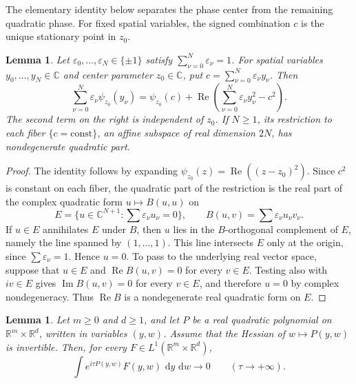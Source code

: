 \documentclass[a4paper,11pt]{article}
\newcommand{\R}{\mathbb{R}}
\newcommand{\C}{\mathbb{C}}
\newcommand{\dd}{\,\text{d}}
\theoremstyle{plain}
\newtheorem{lem}[thm]{Lemma}
\theoremstyle{definition}
\theoremstyle{remark}
\begin{document}
The elementary identity below separates the phase center from the remaining quadratic phase. For fixed spatial variables, the signed combination $c$ is the unique stationary point in $z_0$.

\begin{lem}\label{lem-signed-quadratic-normal-form}
Let $\varepsilon_0,\ldots,\varepsilon_N\in\{\pm1\}$ satisfy
$\sum_{\nu=0}^N\varepsilon_\nu=1$.  For spatial variables
$y_0,\ldots,y_N\in\C$ and center parameter $z_0\in\C$, put
$c=\sum_{\nu=0}^N\varepsilon_\nu y_\nu$.  Then
\begin{equation}\label{signed-quadratic-identity}
        \sum_{\nu=0}^N\varepsilon_\nu\psi_{z_0}(y_\nu)
        =\psi_{z_0}(c)+
        \operatorname{Re}\left(\sum_{\nu=0}^N\varepsilon_\nu y_\nu^2-c^2\right).
\end{equation}
The second term on the right is independent of $z_0$.  If $N\ge1$, its
restriction to each fiber $\{c=\mathrm{const}\}$, an affine subspace of real
dimension $2N$, has nondegenerate quadratic part.
\end{lem}

\begin{proof}
The identity follows by expanding
$\psi_{z_0}(z)=\operatorname{Re}((z-z_0)^2)$.  Since $c^2$ is constant on each
fiber, the quadratic part of the restriction is the real part of the complex
quadratic form $u\mapsto B(u,u)$ on
\begin{equation*}
        E=\{u\in\C^{N+1}:\textstyle\sum\varepsilon_\nu u_\nu=0\},
        \qquad
        B(u,v)=\sum\varepsilon_\nu u_\nu v_\nu .
\end{equation*}
If $u\in E$ annihilates $E$ under
$B$, then $u$ lies in the $B$-orthogonal complement of $E$, namely the line
spanned by $(1,\ldots,1)$.  This line intersects $E$ only at the origin, since
$\sum\varepsilon_\nu=1$.  Hence $u=0$.  To pass to the underlying real vector space, suppose that $u\in E$ and
$\operatorname{Re}B(u,v)=0$ for every $v\in E$.  Testing also with
$iv\in E$ gives $\operatorname{Im}B(u,v)=0$ for every $v\in E$, and therefore $u=0$ by
complex nondegeneracy.  Thus $\operatorname{Re}B$ is a
nondegenerate real quadratic form on $E$.
\end{proof}

\begin{lem}\label{lem-quadratic-RL}
Let $m\ge0$ and $d\ge1$, and let $P$ be a real quadratic polynomial on
$\R^m\times\R^d$, written in variables $(y,w)$.  Assume that the Hessian of
$w\mapsto P(y,w)$ is invertible.  Then, for every
$F\in L^1(\R^m\times\R^d)$,
\begin{equation}
        \int e^{i\tau P(y,w)}F(y,w)\,\dd y\,\dd w\longrightarrow0
        \qquad (\tau\to+\infty).
\end{equation}
\end{lem}
\end{document}
